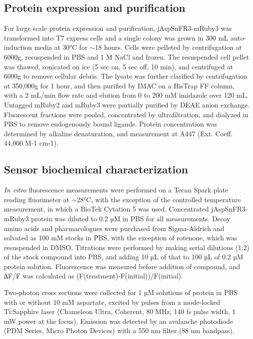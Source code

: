 \documentclass[9pt,lineno]{elife}
\begin{document}
\subsection{Protein expression and purification}
For large scale protein expression and purification, jAspSnFR3-mRuby3 was transformed into T7 express cells and a single colony was grown in 300 mL auto-induction media \citep{Studier2005-ki} at 30°C for $\sim$18 hours.
Cells were pelleted by centrifugation at 6000g, resuspended in PBS and 1 M NaCl and frozen.
The resuspended cell pellet was thawed, sonicated on ice (5 sec on, 5 sec off, 10 min), and centrifuged at 6000g to remove cellular debris.
The lysate was further clarified by centrifugation at 350,000g for 1 hour, and then purified by IMAC on a HisTrap FF column, with a 2 mL/min flow rate and elution from 0 to 200 mM imidazole over 120 mL.
Untagged mRuby2 and mRuby3 were partially purified by DEAE anion exchange.
Fluorescent fractions were pooled, concentrated by ultrafiltration, and dialyzed in PBS to remove endogenously bound ligands.
Protein concentration was determined by alkaline denaturation, and measurement at A447 (Ext. Coeff. 44,000 M-1 cm-1).

\subsection{Sensor biochemical characterization}
\textit{In vitro} fluorescence measurements were performed on a Tecan Spark plate reading fluorimeter at $\sim$28°C, with the exception of the controlled temperature measurement, in which a BioTek Cytation 5 was used.
Concentrated jAspSnFR3-mRuby3 protein was diluted to 0.2 µM in PBS for all measurements.
Decoy amino acids and pharmacologues were purchased from Sigma-Aldrich and solvated as 100 mM stocks in PBS, with the exception of rotenone, which was resuspended in DMSO.
Titrations were performed by making serial dilutions (1:2) of the stock compound into PBS, and adding 10 µL of that to 100 µL of 0.2 µM protein solution.
Fluorescence was measured before addition of compound, and ∆F/F was calculated as (F(treatment)-F(initial))/F(initial).

Two-photon cross sections were collected for 1 µM solutions of protein in PBS with or without 10 mM aspartate, excited by pulses from a mode-locked Ti:Sapphire laser (Chameleon Ultra, Coherent, 80 MHz, 140 fs pulse width, 1 mW power at the focus).
Emission was detected by an avalanche photodiode (PDM Series, Micro Photon Devices) with a 550 nm filter (88 nm bandpass).
\end{document}
